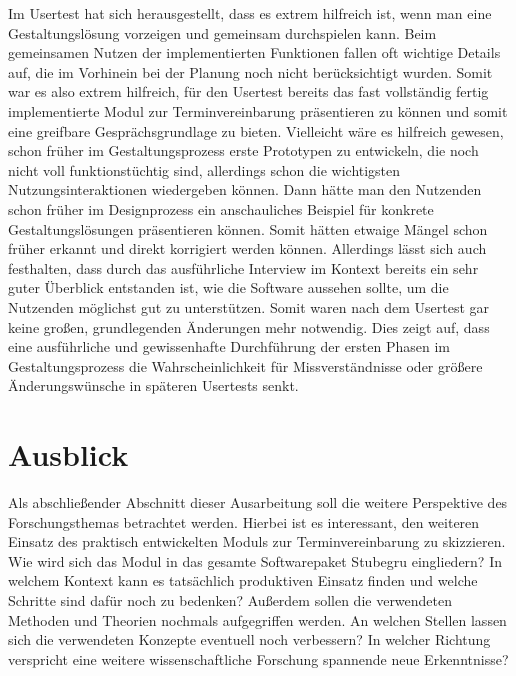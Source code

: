 Im Usertest hat sich herausgestellt, dass es extrem hilfreich ist, wenn man
eine Gestaltungslösung vorzeigen und gemeinsam durchspielen kann. Beim
gemeinsamen Nutzen der implementierten Funktionen fallen oft wichtige Details
auf, die im Vorhinein bei der Planung noch nicht berücksichtigt wurden. Somit
war es also extrem hilfreich, für den Usertest bereits das fast vollständig
fertig implementierte Modul zur Terminvereinbarung präsentieren zu können und
somit eine greifbare Gesprächsgrundlage zu bieten. Vielleicht wäre es hilfreich
gewesen, schon früher im Gestaltungsprozess erste Prototypen zu entwickeln, die
noch nicht voll funktionstüchtig sind, allerdings schon die wichtigsten
Nutzungsinteraktionen wiedergeben können. Dann hätte man den Nutzenden schon
früher im Designprozess ein anschauliches Beispiel für konkrete
Gestaltungslösungen präsentieren können. Somit hätten etwaige Mängel schon
früher erkannt und direkt korrigiert werden können. Allerdings lässt sich
auch festhalten, dass durch das ausführliche Interview im Kontext bereits ein
sehr guter Überblick entstanden ist, wie die Software aussehen sollte, um die
Nutzenden möglichst gut zu unterstützen. Somit waren nach dem Usertest gar
keine großen, grundlegenden Änderungen mehr notwendig. Dies zeigt auf, dass
eine ausführliche und gewissenhafte Durchführung der ersten Phasen im
Gestaltungsprozess die Wahrscheinlichkeit für Missverständnisse oder größere
Änderungswünsche in späteren Usertests senkt.

\section{Ausblick}
\label{subsection:outlook}

Als abschließender Abschnitt dieser Ausarbeitung soll die weitere Perspektive
des Forschungsthemas betrachtet werden. Hierbei ist es interessant, den weiteren
Einsatz des praktisch entwickelten Moduls zur Terminvereinbarung zu skizzieren.
Wie wird sich das Modul in das gesamte Softwarepaket Stubegru eingliedern? In
welchem Kontext kann es tatsächlich produktiven Einsatz finden und welche
Schritte sind dafür noch zu bedenken? Außerdem sollen die verwendeten Methoden
und Theorien nochmals aufgegriffen werden. An welchen Stellen lassen sich die
verwendeten Konzepte eventuell noch verbessern? In welcher Richtung verspricht
eine weitere wissenschaftliche Forschung spannende neue Erkenntnisse?

